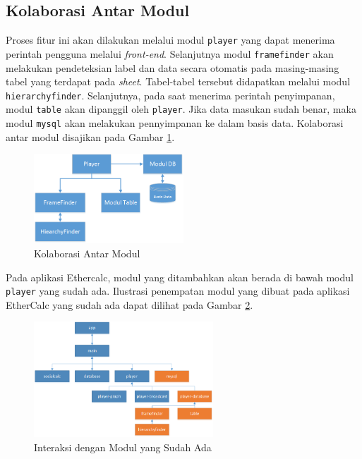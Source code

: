 	\subsection{Kolaborasi Antar Modul}
	Proses fitur ini akan dilakukan melalui modul \texttt{player} yang dapat menerima perintah pengguna melalui \textit{front-end}. Selanjutnya modul \texttt{framefinder} akan melakukan pendeteksian label dan data secara otomatis pada masing-masing tabel yang terdapat pada \textit{sheet}. Tabel-tabel tersebut didapatkan melalui modul \texttt{hierarchyfinder}. Selanjutnya, pada saat menerima perintah penyimpanan, modul \texttt{table} akan dipanggil oleh \texttt{player}. Jika data masukan sudah benar, maka modul \texttt{mysql} akan melakukan pennyimpanan ke dalam basis data. Kolaborasi antar modul disajikan pada Gambar \ref{ModuleFlow}.

	\begin{figure}[htb]
	    \centering
	    \includegraphics[width=0.5\textwidth]{resources/chapter-4-module-flow.png}
	    \caption{Kolaborasi Antar Modul}
		\label{ModuleFlow}
	\end{figure}

	Pada aplikasi Ethercalc, modul yang ditambahkan akan berada di bawah modul \texttt{player} yang sudah ada. Ilustrasi penempatan modul yang dibuat pada aplikasi EtherCalc yang sudah ada dapat dilihat pada Gambar \ref{ModulePlacing}.

	\begin{figure}[htb]
	    \centering
	    \includegraphics[width=0.6\textwidth]{resources/chapter-4-module-placing.png}
	    \caption{Interaksi dengan Modul yang Sudah Ada}
		\label{ModulePlacing}
	\end{figure}

